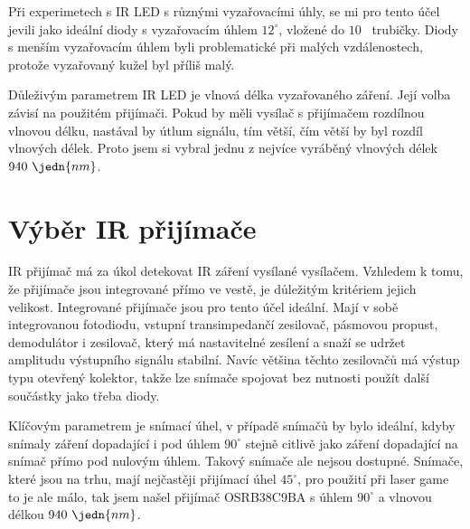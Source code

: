 Při experimetech s IR LED s různými vyzařovacími úhly, se mi pro tento účel jevili jako ideální diody s vyzařovacím úhlem $12^\circ$, vložené do $10$~ trubičky. Diody s menším vyzařovacím úhlem byli problematické při malých vzdálenostech, protože vyzařovaný kužel byl příliš malý.

Důleživým parametrem IR LED je vlnová délka vyzařovaného záření. Její volba závisí na použitém přijímači. Pokud by měli vysílač s přijímačem rozdílnou vlnovou délku, nastával by útlum signálu, tím větší, čím větší by byl rozdíl vlnových délek. Proto jsem si vybral jednu z nejvíce vyráběný vlnových délek $940~\jedn{nm}$.

\section{Výběr IR přijímače}
IR přijímač má za úkol detekovat IR záření vysílané vysílačem. Vzhledem k tomu, že přijímače jsou integrované přímo ve vestě, je důležitým kritériem jejich velikost. Integrované přijímače jsou pro tento účel ideální. Mají v sobě integrovanou fotodiodu, vstupní transimpedančí zesilovač, pásmovou propust, demodulátor i zesilovač, který má nastavitelné zesílení a snaží se udržet amplitudu výstupního signálu stabilní. Navíc většina těchto zesilovačů má výstup typu otevřený kolektor, takže lze snímače spojovat bez nutnosti použít další součástky jako třeba diody.

Klíčovým parametrem je snímací úhel, v případě snímačů by bylo ideální, kdyby snímaly záření dopadající i pod úhlem $90^\circ$ stejně citlivě jako záření dopadající na snímač přímo pod nulovým úhlem. Takový snímače ale nejsou dostupné. Snímače, které jsou na trhu, mají nejčastěji přijímací úhel $45^\circ$, pro použití při laser game to je ale málo, tak jsem našel přijímač OSRB38C9BA s úhlem $90^\circ$ a vlnovou délkou $940~\jedn{nm}$.

